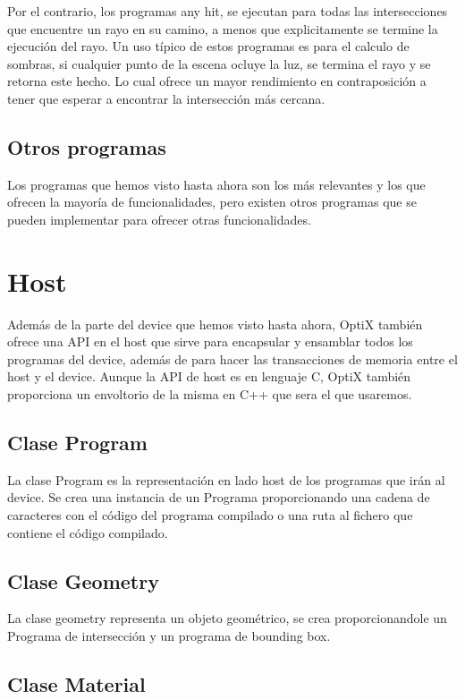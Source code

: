 Por el contrario, los programas any hit, se ejecutan para todas las intersecciones que encuentre un rayo en su camino, a menos que explicitamente se termine la ejecución del rayo.
Un uso típico de estos programas es para el calculo de sombras, si cualquier punto de la escena ocluye la luz, se termina el rayo y se retorna este hecho. Lo cual ofrece un mayor rendimiento en contraposición a tener que esperar a encontrar la intersección más cercana.

\subsection{Otros programas}

Los programas que hemos visto hasta ahora son los más relevantes y los que ofrecen la mayoría de funcionalidades, pero existen otros programas que se pueden implementar para ofrecer otras funcionalidades.

\clearpage

\section{Host}

Además de la parte del device que hemos visto hasta ahora, OptiX también ofrece una API en el host que sirve para encapsular y ensamblar todos los programas del device, además de para hacer las transacciones de memoria entre el host y el device. Aunque la API de host es en lenguaje C, OptiX también proporciona un envoltorio de la misma en C++ que sera el que usaremos. 

\subsection{Clase Program}

La clase Program es la representación en lado host de los programas que irán al device.
Se crea una instancia de un Programa proporcionando una cadena de caracteres con el código del programa compilado o una ruta al fichero que contiene el código compilado. 

\subsection{Clase Geometry}

La clase geometry representa un objeto geométrico, se crea proporcionandole un Programa de intersección y un programa de bounding box.

\subsection{Clase Material}

